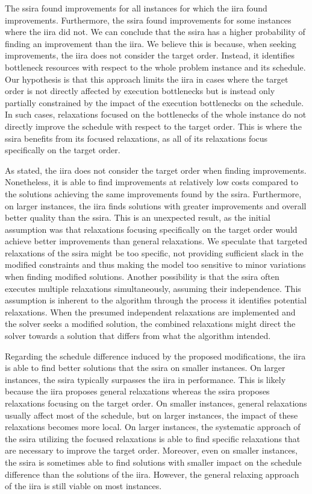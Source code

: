 The \ac{ssira} found improvements for all instances for which the \ac{iira} found improvements.
Furthermore, the \ac{ssira} found improvements for some instances where the \ac{iira} did not.
We can conclude that the \ac{ssira} has a higher probability of finding an improvement than the \ac{iira}.
We believe this is because, when seeking improvements, the \ac{iira} does not consider the target order.
Instead, it identifies bottleneck resources with respect to the whole problem instance
and its schedule.
Our hypothesis is that this approach limits the \ac{iira} in cases
where the target order is not directly affected by execution bottlenecks
but is instead only partially constrained by the impact of the execution bottlenecks on the schedule.
In such cases, relaxations focused on the bottlenecks of the whole instance do not directly
improve the schedule with respect to the target order. 
This is where the \ac{ssira} benefits from its focused relaxations,
as all of its relaxations focus specifically on the target order.

As stated, the \ac{iira} does not consider the target order when finding improvements.
Nonetheless, it is able to find improvements at relatively low costs
compared to the solutions achieving the same improvements found by the \ac{ssira}.
Furthermore, on larger instances, the \ac{iira} finds solutions
with greater improvements and overall better quality than the \ac{ssira}.
This is an unexpected result,
as the initial assumption was that relaxations focusing specifically on the target order
would achieve better improvements than general relaxations.
We speculate that targeted relaxations of the \ac{ssira} might be too specific,
not providing sufficient slack in the modified constraints
and thus making the model too sensitive to minor variations when finding modified solutions.
Another possibility is that the \ac{ssira} often executes multiple relaxations simultaneously,
assuming their independence.
This assumption is inherent to the algorithm through the process it identifies potential relaxations.
When the presumed independent relaxations are implemented and the solver seeks a modified solution,
the combined relaxations might direct the solver towards a solution
that differs from what the algorithm intended.

Regarding the schedule difference induced by the proposed modifications,
the \ac{iira} is able to find better solutions that the \ac{ssira} on smaller instances.
On larger instances, the \ac{ssira} typically surpasses the \ac{iira} in performance.
This is likely because the \ac{iira} proposes general relaxations
whereas the \ac{ssira} proposes relaxations focusing on the target order.
On smaller instances, general relaxations usually affect most of the schedule,
but on larger instances, the impact of these relaxations becomes more local.
On larger instances, the systematic approach of the \ac{ssira} utilizing the focused relaxations
is able to find specific relaxations that are necessary to improve the target order.
Moreover, even on smaller instances, the \ac{ssira} is sometimes able to find solutions with
smaller impact on the schedule difference than the solutions of the \ac{iira}.
However, the general relaxing approach of the \ac{iira} is still viable on most instances.

